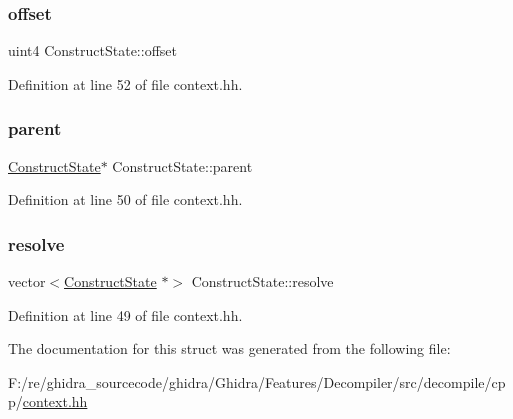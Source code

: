\mbox{\label{struct_construct_state_a2e811d9b2781e4ee403b471aa910046d}} 
\subsubsection{\texorpdfstring{offset}{offset}}
{\footnotesize\ttfamily uint4 Construct\+State\+::offset}



Definition at line 52 of file context.\+hh.

\mbox{\label{struct_construct_state_a6b2acaed2be0ee237a8d31627ca9100e}} 
\subsubsection{\texorpdfstring{parent}{parent}}
{\footnotesize\ttfamily \mbox{\hyperlink{struct_construct_state}{Construct\+State}}$\ast$ Construct\+State\+::parent}



Definition at line 50 of file context.\+hh.

\mbox{\label{struct_construct_state_a9a471324ab2bef5b35a7f2f35d55bebc}} 
\subsubsection{\texorpdfstring{resolve}{resolve}}
{\footnotesize\ttfamily vector$<$\mbox{\hyperlink{struct_construct_state}{Construct\+State}} $\ast$$>$ Construct\+State\+::resolve}



Definition at line 49 of file context.\+hh.



The documentation for this struct was generated from the following file\+:\begin{DoxyCompactItemize}
\item 
F\+:/re/ghidra\+\_\+sourcecode/ghidra/\+Ghidra/\+Features/\+Decompiler/src/decompile/cpp/\mbox{\hyperlink{context_8hh}{context.\+hh}}\end{DoxyCompactItemize}
